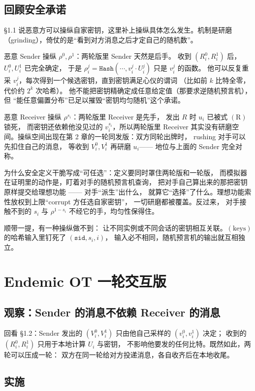 \subsection{回顾安全承诺}

§1.1 说恶意方可以操纵自家密钥，这里补上操纵具体怎么发生。机制是研磨
（grinding），倚仗的是“看到对方消息之后才定自己的随机数”。

恶意 Sender 操纵 $\rho^0, \rho^1$：两轮版里 Sender 天然是后手。
收到 $(R_i^0, R_i^1)$ 后，$U_i^0, U_i^1$ 已完全确定，
于是 $\rho_i^j = \mathtt{Hash}(\cdots, v_i^j \cdot U_i^j)$ 只是 $v_i^j$ 的函数。
他可以反复重采 $v_i^j$，每次得到一个候选密钥，直到密钥满足心仪的谓词
（比如前 $k$ 比特全零，代价约 $2^k$ 次哈希）。
他不能把密钥精确定成任意给定值（那要求逆随机预言机），但
“能任意偏置分布”已足以摧毁“密钥均匀随机”这个承诺。

恶意 Receiver 操纵 $\rho^{s_i}$：两轮版里 Receiver 是先手，
发出 $R$ 时 $u_i$ 已被式 $(\text{R})$ 锁死，
而密钥还依赖他没见过的 $v_i^{s_i}$，所以两轮版里 Receiver
其实没有研磨空间。操纵空间出现在第 2 章的一轮同发版：双方同轮出牌时，
rushing 对手可以先扣住自己的消息，
等收到 $V_i^0, V_i^1$ 再研磨 $u_i$------ 地位与上面的 Sender 完全对称。

为什么安全定义干脆写成“可任选”：定义要同时罩住两轮版和一轮版，
而模拟器在证明里的动作是，盯着对手的随机预言机查询，
把对手自己算出来的那把密钥原样提交给理想功能 ------ 对手“派生”出什么，
就算它“选择”了什么。理想功能索性放权到上限“corrupt 方任选自家密钥”，
一切研磨都被覆盖。反过来，
对手接触不到的 $s_i$ 与 $\rho^{1-s_i}$ 不经它的手，均匀性保得住。

顺带一提，有一种操纵做不到：
让不同实例或不同会话的密钥相互关联。$(\text{keys})$ 的哈希输入里钉死了 $(\mathtt{sid}, s_i, i)$，
输入必不相同，随机预言机的输出就互相独立。

\section{Endemic OT 一轮交互版}
\subsection{观察：Sender 的消息不依赖 Receiver 的消息}

回看 §1.2：Sender
发出的 $(V_i^0, V_i^1)$ 只由他自己采样的 $(v_i^0, v_i^1)$ 决定；
收到的 $(R_i^0, R_i^1)$ 只用于本地计算 $U_i$ 与密钥，
不影响他要发的任何比特。既然如此，两轮可以压成一轮：
双方在同一轮给对方投递消息，各自收齐后在本地收尾。

\subsection{实施}

